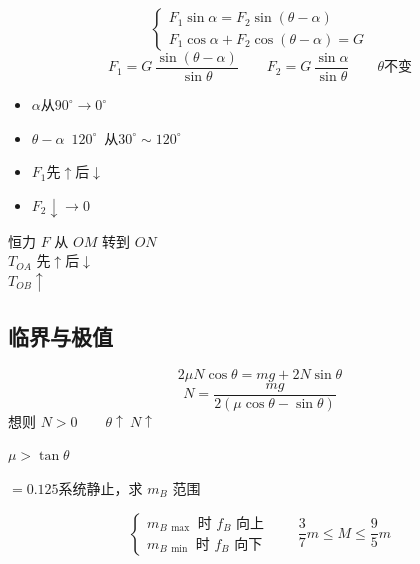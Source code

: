 \begin{problem}[1]
\begin{solution}
\[ \begin{cases} F_1\sin\alpha=F_2\sin(\theta-\alpha)\\ F_1\cos\alpha+F_2\cos(\theta-\alpha)=G \end{cases} \]
\[ F_1=G\,\frac{\sin(\theta-\alpha)}{\sin\theta}\qquad F_2=G\,\frac{\sin\alpha}{\sin\theta}\qquad\theta\text{不变} \]
\begin{itemize}
\item $\alpha$从$90^\circ\to0^\circ$
\item $\theta-\alpha$\ $120^\circ$\ 从$30^\circ\sim120^\circ$ %
\item $F_1$先$\uparrow$后$\downarrow$
\item $F_2\downarrow\to0$
\end{itemize}
\end{solution}
\end{problem}

恒力 $F$ 从 $OM$ 转到 $ON$ \\
$T_{OA}$ 先$\uparrow$后$\downarrow$ \\
$T_{OB}\uparrow$

\subsection{临界与极值}

\[
2\mu N\cos\theta=mg+2N\sin\theta
\]
\[
N=\frac{mg}{2(\mu\cos\theta-\sin\theta)}
\]
想则 $N>0$　　$\theta\uparrow\ N\uparrow$ %

$\mu>\tan\theta$

\begin{problem}[1、]
\unclear{$\mu$}$=0.125$\quad 系统静止，求 $m_B$ 范围
\begin{solution}
\[ \begin{cases} m_{B\,\max}\text{ 时 }f_B\text{ 向上}\\[2pt] m_{B\,\min}\text{ 时 }f_B\text{ 向下}\end{cases}\qquad \frac37m\le M\le\frac95m \]
\end{solution}
\end{problem}

